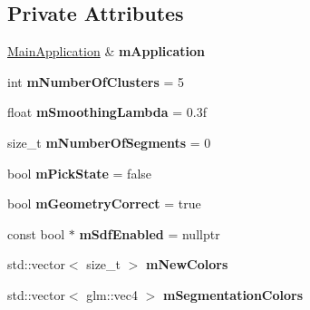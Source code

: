 \subsection*{Private Attributes}
\begin{DoxyCompactItemize}
\item 
\mbox{\label{classpepr3d_1_1_segmentation_ac2717aba7269a3eb01e1ec3c03331c17}} 
\mbox{\hyperlink{classpepr3d_1_1_main_application}{Main\+Application}} \& {\bfseries m\+Application}
\item 
\mbox{\label{classpepr3d_1_1_segmentation_aeae786bdab94aea8ffa0fb73390294dc}} 
int {\bfseries m\+Number\+Of\+Clusters} = 5
\item 
\mbox{\label{classpepr3d_1_1_segmentation_a9b58e2e5f005ec47eb16cb65033b81ae}} 
float {\bfseries m\+Smoothing\+Lambda} = 0.\+3f
\item 
\mbox{\label{classpepr3d_1_1_segmentation_ac28116b16a089414c90acaa13e1b767d}} 
size\+\_\+t {\bfseries m\+Number\+Of\+Segments} = 0
\item 
\mbox{\label{classpepr3d_1_1_segmentation_a29b4f82176495128f046c4f5556b0ed0}} 
bool {\bfseries m\+Pick\+State} = false
\item 
\mbox{\label{classpepr3d_1_1_segmentation_af42e20289921819f50fcbc36d6e058f5}} 
bool {\bfseries m\+Geometry\+Correct} = true
\item 
\mbox{\label{classpepr3d_1_1_segmentation_ab119390cf1e8b5f5ba33d112a3a1806c}} 
const bool $\ast$ {\bfseries m\+Sdf\+Enabled} = nullptr
\item 
\mbox{\label{classpepr3d_1_1_segmentation_a4ce747a53afd47abaeff6f98070c8071}} 
std\+::vector$<$ size\+\_\+t $>$ {\bfseries m\+New\+Colors}
\item 
\mbox{\label{classpepr3d_1_1_segmentation_a4b71215638c39a9381fbd8980e65986c}} 
std\+::vector$<$ glm\+::vec4 $>$ {\bfseries m\+Segmentation\+Colors}
\item 

\end{DoxyCompactItemize}
